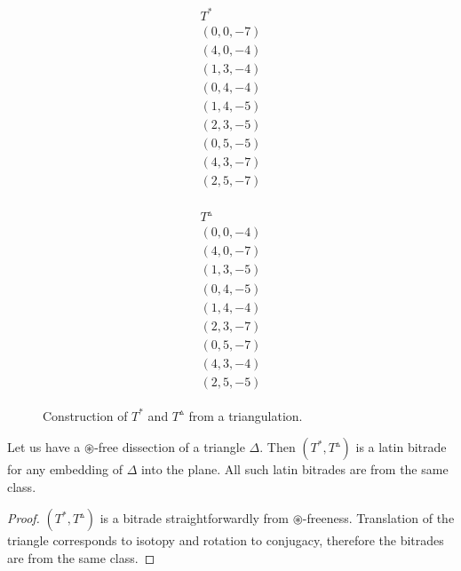 \begin{exmp}
\begin{figure}[htb]
\begin{minipage}{.43\linewidth}
	\end{minipage}
	\hspace{.1\linewidth}
	\begin{minipage}{.16\linewidth}
		\begin{align*}
			\begin{array}{c}
				T^* \\ \hline
				(0,0,-7) \\
				(4,0,-4) \\
				(1,3,-4) \\
				(0,4,-4) \\
				(1,4,-5) \\
				(2,3,-5) \\
				(0,5,-5) \\
				(4,3,-7) \\
				(2,5,-7)
			\end{array}
		\end{align*}
	\end{minipage}
	\hspace{.04\linewidth}
	\begin{minipage}{.16\linewidth}
		\begin{align*}
			\begin{array}{c}
				T^\vartriangle \\ \hline
				(0,0,-4) \\
				(4,0,-7) \\
				(1,3,-5) \\
				(0,4,-5) \\
				(1,4,-4) \\
				(2,3,-7) \\
				(0,5,-7) \\
				(4,3,-4) \\
				(2,5,-5)
			\end{array}
		\end{align*}
	\end{minipage}
	\caption{Construction of $T^*$ and $T^\vartriangle$ from a triangulation.}
	\label{fig:arrows}
\end{figure}
\end{exmp}%

\begin{lem}
Let us have a $\circledast$-free dissection of a triangle $\Delta$. Then $(T^*, T^\vartriangle)$ is a latin bitrade for any embedding of $\Delta$ into the plane. All such latin bitrades are from the same class.
\end{lem}
\begin{proof}
 $(T^*, T^\vartriangle)$ is a bitrade straightforwardly from $\circledast$-freeness. Translation of the triangle corresponds to isotopy and rotation to conjugacy, therefore the bitrades are from the same class.
\end{proof}

